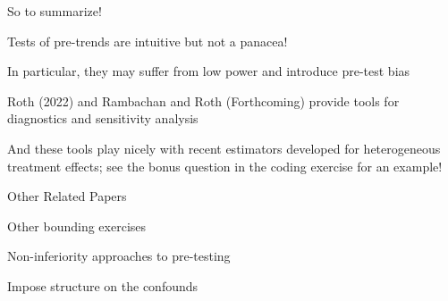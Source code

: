 \documentclass[aspectratio = 169, 13pt]{beamer}
\begin{document}
\begin{frame}{So to summarize!}
	\begin{wideitemize}
		\item
		Tests of pre-trends are intuitive but not a panacea!
		    
		\item
		In particular, they may suffer from low power and introduce pre-test bias
		    
		\item
		Roth (2022) and Rambachan and Roth (Forthcoming) provide tools for diagnostics and sensitivity analysis
		    
		\item
		And these tools play nicely with recent estimators developed for heterogeneous treatment effects; see the bonus question in the coding exercise for an example!
		    
	\end{wideitemize}
\end{frame}

\begin{frame}{Other Related Papers}
	
	\begin{wideitemize}
		
		\item
		Other bounding exercises \citep{manski_how_2017, ye_negative_2021}
		
		\item
		Non-inferiority approaches to pre-testing \citep{bilinski_no_2018, dette_difference--differences_2020}
		
		\item
		Impose structure on the confounds \citep{freyaldenhoven_pre-event_2019}
	\end{wideitemize}
	    
\end{frame}






\end{document}
